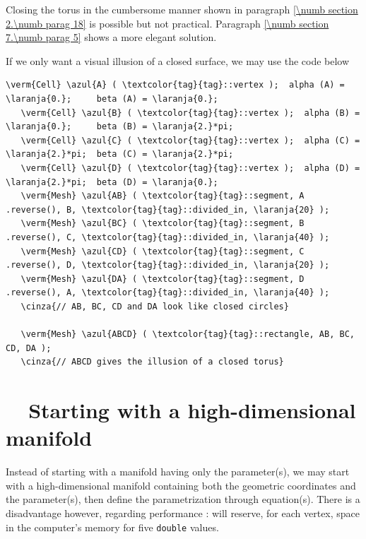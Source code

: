 Closing the torus in the cumbersome manner shown in paragraph
\ref{\numb section 2.\numb parag 18} is possible but not practical.
Paragraph \ref{\numb section 7.\numb parag 5} shows a more elegant solution.

If we only want a visual illusion of a closed surface, we may use the code below

\begin{Verbatim}[commandchars=\\\{\},formatcom=\small\tt,baselinestretch=0.94]
   \verm{Cell} \azul{A} ( \textcolor{tag}{tag}::vertex );  alpha (A) = \laranja{0.};     beta (A) = \laranja{0.};
   \verm{Cell} \azul{B} ( \textcolor{tag}{tag}::vertex );  alpha (B) = \laranja{0.};     beta (B) = \laranja{2.}*pi;
   \verm{Cell} \azul{C} ( \textcolor{tag}{tag}::vertex );  alpha (C) = \laranja{2.}*pi;  beta (C) = \laranja{2.}*pi;
   \verm{Cell} \azul{D} ( \textcolor{tag}{tag}::vertex );  alpha (D) = \laranja{2.}*pi;  beta (D) = \laranja{0.};
   \verm{Mesh} \azul{AB} ( \textcolor{tag}{tag}::segment, A .reverse(), B, \textcolor{tag}{tag}::divided_in, \laranja{20} );
   \verm{Mesh} \azul{BC} ( \textcolor{tag}{tag}::segment, B .reverse(), C, \textcolor{tag}{tag}::divided_in, \laranja{40} );
   \verm{Mesh} \azul{CD} ( \textcolor{tag}{tag}::segment, C .reverse(), D, \textcolor{tag}{tag}::divided_in, \laranja{20} );
   \verm{Mesh} \azul{DA} ( \textcolor{tag}{tag}::segment, D .reverse(), A, \textcolor{tag}{tag}::divided_in, \laranja{40} );
   \cinza{// AB, BC, CD and DA look like closed circles}

   \verm{Mesh} \azul{ABCD} ( \textcolor{tag}{tag}::rectangle, AB, BC, CD, DA );
   \cinza{// ABCD gives the illusion of a closed torus}
\end{Verbatim}


\section{~~Starting with a high-dimensional manifold}\label{\numb section 2.\numb parag 20}

Instead of starting with a manifold having only the parameter(s), we may start with a
high-dimensional manifold containing both the geometric coordinates and the parameter(s),
then define the parametrization through equation(s).
There is a disadvantage however, regarding performance : {\maniFEM} will reserve,
for each vertex, space in the computer's memory for five {\small\tt double} values.

